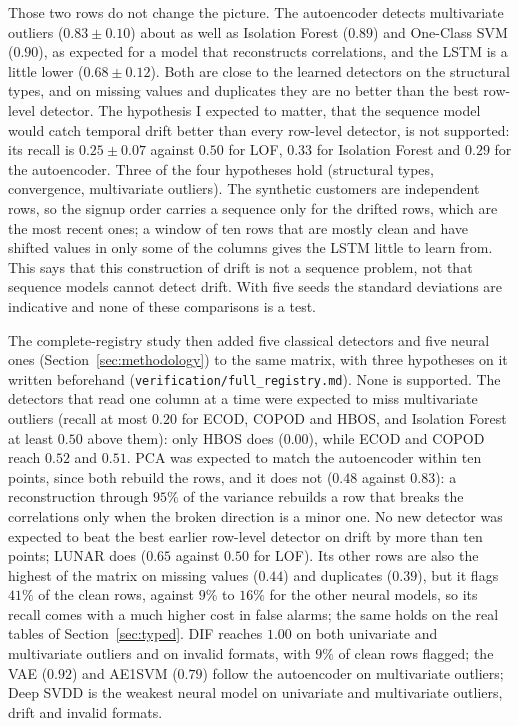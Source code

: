 \documentclass[conference]{IEEEtran}
\begin{document}
Those two rows do not change the picture. The autoencoder detects multivariate
outliers ($0.83 \pm 0.10$) about as well as Isolation Forest ($0.89$) and
One-Class SVM ($0.90$), as expected for a model that reconstructs correlations,
and the LSTM is a little lower ($0.68 \pm 0.12$). Both are close to the learned
detectors on the structural types, and on missing values and duplicates they are
no better than the best row-level detector. The hypothesis I expected to
matter, that the sequence model would catch temporal drift better than every
row-level detector, is not supported: its recall is $0.25 \pm 0.07$ against
$0.50$ for LOF, $0.33$ for Isolation Forest and $0.29$ for the autoencoder.
Three of the four hypotheses hold (structural types, convergence, multivariate
outliers). The synthetic customers are independent rows, so the signup order
carries a sequence only for the drifted rows, which are the most recent ones; a
window of ten rows that are mostly clean and have shifted values in only some of
the columns gives the LSTM little to learn from. This says that this
construction of drift is not a sequence problem, not that sequence models
cannot detect drift. With five seeds the standard deviations are indicative and none of
these comparisons is a test.

The complete-registry study then added five classical detectors and five neural ones
(Section~\ref{sec:methodology}) to the same matrix, with three hypotheses on it written
beforehand (\texttt{verification/full\_registry.md}). None is supported. The
detectors that read one column at a time were expected to miss multivariate outliers (recall
at most $0.20$ for ECOD, COPOD and HBOS, and Isolation Forest at least $0.50$ above them): only HBOS does
($0.00$), while ECOD and COPOD reach $0.52$ and $0.51$. PCA was expected to match the
autoencoder within ten points, since both rebuild the rows, and it does not ($0.48$ against
$0.83$): a reconstruction through $95\%$ of the variance rebuilds a row that breaks the
correlations only when the broken direction is a minor one. No new detector was expected to
beat the best earlier row-level detector on drift by more than ten points; LUNAR does
($0.65$ against $0.50$ for LOF). Its other rows are also the highest of the matrix
on missing values ($0.44$) and duplicates ($0.39$), but it flags $41\%$ of the clean rows, against
$9\%$ to $16\%$ for the other neural models, so its recall comes with a much higher cost in false
alarms; the same holds on the real tables of Section~\ref{sec:typed}. DIF reaches $1.00$ on both univariate and
multivariate outliers and on invalid formats, with $9\%$ of clean rows flagged; the VAE ($0.92$)
and AE1SVM ($0.79$) follow the autoencoder on multivariate outliers; Deep SVDD is the weakest
neural model on univariate and multivariate outliers, drift and invalid formats.
\end{document}
